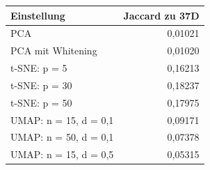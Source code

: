\begin{tabular}{lr}
\toprule
Einstellung & Jaccard zu 37D \\
\midrule
PCA & 0,01021 \\
PCA mit Whitening & 0,01020 \\
t-SNE: p = 5 & 0,16213 \\
t-SNE: p = 30 & 0,18237 \\
t-SNE: p = 50 & 0,17975 \\
UMAP: n = 15, d = 0,1 & 0,09171 \\
UMAP: n = 50, d = 0,1 & 0,07378 \\
UMAP: n = 15, d = 0,5 & 0,05315 \\
\bottomrule
\end{tabular}
